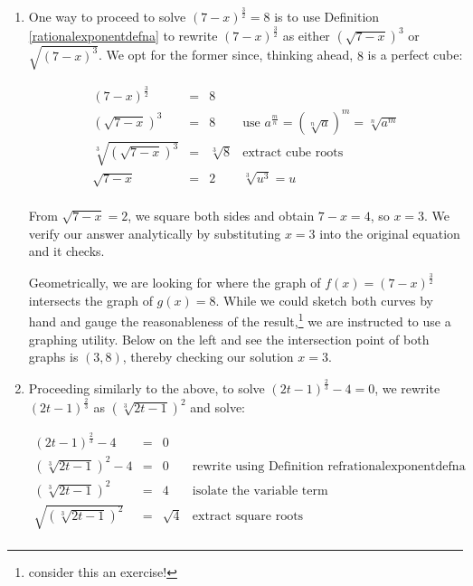 \documentclass{ximera}
\begin{document}
\begin{example}
\begin{enumerate}

\item  One way to proceed to solve  $(7-x)^{\frac{3}{2}} = 8$ is to use Definition \ref{rationalexponentdefna} to rewrite $(7-x)^{\frac{3}{2}}$ as either $(\sqrt{7-x})^3$ or $\sqrt{(7-x)^3}$.  We opt for the former since, thinking ahead,  $8$ is a perfect cube: 

\[ \begin{array}{rclr}

(7-x)^{\frac{3}{2}} & = & 8 & \\

(\sqrt{7-x})^3 & = & 8 & \text{use } a^{\frac {m}{n}} = \left (\sqrt [n]{a}\right )^m = \sqrt [n]{a^m}\\

\sqrt[3]{(\sqrt{7-x})^3} & = & \sqrt[3]{8} & \text{extract cube roots}  \\

\sqrt{7-x} & = & 2 & \text{$\sqrt[3]{u^3}= u$} \\ \end{array} 
\]

From $\sqrt{7-x} =  2$, we square both sides and obtain $7-x = 4$, so $x = 3$.  We verify our answer analytically by substituting $x=3$ into the original equation and it checks.

Geometrically, we are looking for where the graph of $f(x) = (7-x)^{\frac{3}{2}}$ intersects the graph of $g(x) = 8$.  While we could sketch both curves by hand and gauge the reasonableness of the result,\footnote{consider this an exercise!} we are instructed to use a graphing utility.  Below on the left and see the intersection point of both graphs is $(3,8)$, thereby checking our solution $x = 3$.

\item  Proceeding similarly to the above, to solve $(2t-1)^{\frac{2}{3}} -4 = 0$, we rewrite $(2t-1)^{\frac{2}{3}}$ as $(\sqrt[3]{2t-1})^2$ and solve:

\[ \begin{array}{rclr}
(2t-1)^{\frac{2}{3}} -4  & = & 0 & \\

(\sqrt[3]{2t-1})^2 - 4 & = & 0 & \text{rewrite using Definition ref{rationalexponentdefna}} \\
(\sqrt[3]{2t-1})^2 & = & 4 & \text{isolate the variable term} \\

\sqrt{(\sqrt[3]{2t-1})^2 } & = & \sqrt{4} & \text{extract square roots} \\


\end{array}\]
\end{enumerate}
\end{example}
\end{document}
